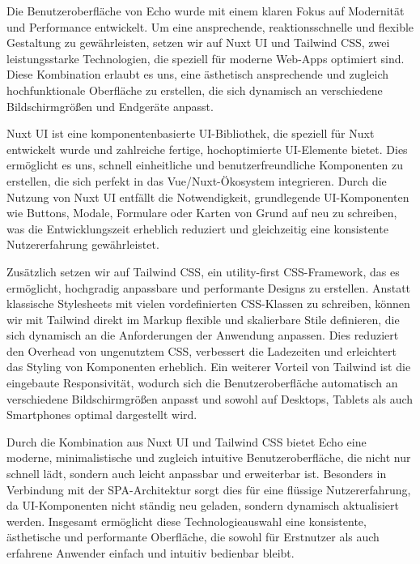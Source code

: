 \documentclass[a4paper,12pt]{article}
\begin{document}
Die Benutzeroberfläche von Echo wurde mit einem klaren Fokus auf Modernität
und Performance entwickelt. Um eine ansprechende,
reaktionsschnelle und flexible Gestaltung zu gewährleisten, setzen wir auf Nuxt
UI und Tailwind CSS, zwei leistungsstarke Technologien, die speziell für
moderne Web-Apps optimiert sind. Diese Kombination erlaubt es uns, eine
ästhetisch ansprechende und zugleich hochfunktionale Oberfläche zu erstellen,
die sich dynamisch an verschiedene Bildschirmgrößen und Endgeräte anpasst.

Nuxt UI ist eine komponentenbasierte UI-Bibliothek, die speziell für Nuxt
entwickelt wurde und zahlreiche fertige, hochoptimierte UI-Elemente bietet.
Dies ermöglicht es uns, schnell einheitliche und benutzerfreundliche
Komponenten zu erstellen, die sich perfekt in das Vue/Nuxt-Ökosystem
integrieren. Durch die Nutzung von Nuxt UI entfällt die Notwendigkeit,
grundlegende UI-Komponenten wie Buttons, Modale, Formulare oder Karten von
Grund auf neu zu schreiben, was die Entwicklungszeit erheblich reduziert und
gleichzeitig eine konsistente Nutzererfahrung gewährleistet.

Zusätzlich setzen wir auf Tailwind CSS, ein utility-first CSS-Framework, das es
ermöglicht, hochgradig anpassbare und performante Designs zu erstellen. Anstatt
klassische Stylesheets mit vielen vordefinierten CSS-Klassen zu schreiben,
können wir mit Tailwind direkt im Markup flexible und skalierbare Stile
definieren, die sich dynamisch an die Anforderungen der Anwendung anpassen.
Dies reduziert den Overhead von ungenutztem CSS, verbessert die Ladezeiten und
erleichtert das Styling von Komponenten erheblich. Ein weiterer Vorteil von
Tailwind ist die eingebaute Responsivität, wodurch sich die Benutzeroberfläche
automatisch an verschiedene Bildschirmgrößen anpasst und sowohl auf Desktops,
Tablets als auch Smartphones optimal dargestellt wird.

Durch die Kombination aus Nuxt UI und Tailwind CSS bietet Echo eine moderne,
minimalistische und zugleich intuitive Benutzeroberfläche, die nicht nur
schnell lädt, sondern auch leicht anpassbar und erweiterbar ist. Besonders in
Verbindung mit der SPA-Architektur sorgt dies für eine flüssige
Nutzererfahrung, da UI-Komponenten nicht ständig neu geladen, sondern dynamisch
aktualisiert werden. Insgesamt ermöglicht diese Technologieauswahl eine
konsistente, ästhetische und performante Oberfläche, die sowohl für Erstnutzer
als auch erfahrene Anwender einfach und intuitiv bedienbar bleibt.
\end{document}
